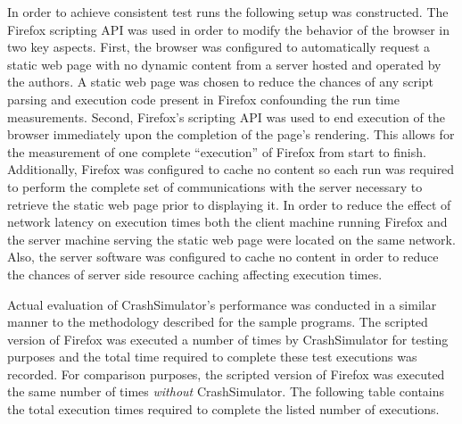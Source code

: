                 In order to achieve consistent test runs the following setup was constructed. The Firefox scripting API
                was used in order to modify the behavior of the browser in two key aspects. First, the browser was
                configured to automatically request a static web page with no dynamic content from a server hosted and
                operated by the authors. A static web page was chosen to reduce the chances of any script parsing and
                execution code present in Firefox confounding the run time measurements. Second, Firefox's scripting API
                was used to end execution of the browser immediately upon the completion of the page's rendering. This
                allows for the measurement of one complete ``execution'' of Firefox from start to finish. Additionally,
                Firefox was configured to cache no content so each run was required to perform the complete set of
                communications with the server necessary to retrieve the static web page prior to displaying it. In
                order to reduce the effect of network latency on execution times both the client machine running Firefox
                and the server machine serving the static web page were located on the same network. Also, the server
                software was configured to cache no content in order to reduce the chances of server side resource
                caching affecting execution times.

                Actual evaluation of CrashSimulator's performance was conducted in a similar manner to the methodology
                described for the sample programs. The scripted version of Firefox was executed a number of times by
                CrashSimulator for testing purposes and the total time required to complete these test executions was
                recorded. For comparison purposes, the scripted version of Firefox was executed the same number of times
                \emph{without} CrashSimulator.  The following table contains the total execution times required to
                complete the listed number of executions.

